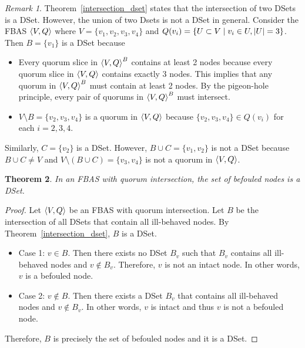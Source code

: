 \documentclass[12pt, psamsfonts]{amsart}
\newtheorem{thm}{Theorem}[section]
\theoremstyle{definition}
\theoremstyle{remark}
\newtheorem{rem}[thm]{Remark}
\numberwithin{equation}{section}
\begin{document}
\begin{rem}
    Theorem~\ref{intersection_dset} states that the intersection of two DSets is a DSet.
    However, the union of two Dsets is not a DSet in general.
    Consider the FBAS $\ev{V, Q}$ where $V = \{ v_1, v_2, v_3, v_4 \}$ and $Q(v_i) = \{ U \subset V \mid v_i \in U, \abs{U} = 3 \}$.
    Then $B = \{ v_1 \}$ is a DSet because
    \begin{itemize}
        \item
            Every quorum slice in $\ev{V, Q}^B$ contains at least 2 nodes because every quorum slice in $\ev{V, Q}$ contains exactly 3 nodes.
            This implies that any quorum in $\ev{V, Q}^B$ must contain at least 2 nodes.
            By the pigeon-hole principle, every pair of quorums in $\ev{V, Q}^B$ must intersect.
        \item
            $V \setminus B = \{ v_2, v_3, v_4 \}$ is a quorum in $\ev{V, Q}$ because $\{ v_2, v_3, v_4 \} \in Q(v_i)$ for each $i = 2, 3, 4$.
    \end{itemize}
    Similarly, $C = \{ v_2 \}$ is a DSet.
    However, $B \cup C = \{ v_1, v_2 \}$ is not a DSet because $B \cup C \ne V$ and $V \setminus (B \cup C) = \{ v_3, v_4 \}$ is not a quorum in $\ev{V, Q}$.
\end{rem}

\begin{thm}\label{befouled_dset}
	In an FBAS with quorum intersection, the set of befouled nodes is a DSet.
\end{thm}

\begin{proof}
	Let $\ev{V, Q}$ be an FBAS with quorum intersection.
	Let $B$ be the intersection of all DSets that contain all ill-behaved nodes.
	By Theorem~\ref{intersection_dset}, $B$ is a DSet.

	\begin{itemize}
		\item
			Case 1: $v \in B$.
			Then there exists no DSet $B_v$ such that $B_v$ contains all ill-behaved nodes and $v \notin B_v$.
			Therefore, $v$ is not an intact node.
			In other words, $v$ is a befouled node.
		\item
			Case 2: $v \notin B$.
			Then there exists a DSet $B_v$ that contains all ill-behaved nodes and $v \notin B_v$.
			In other words, $v$ is intact and thus $v$ is not a befouled node.
	\end{itemize}

	Therefore, $B$ is precisely the set of befouled nodes and it is a DSet.
\end{proof}
\end{document}
